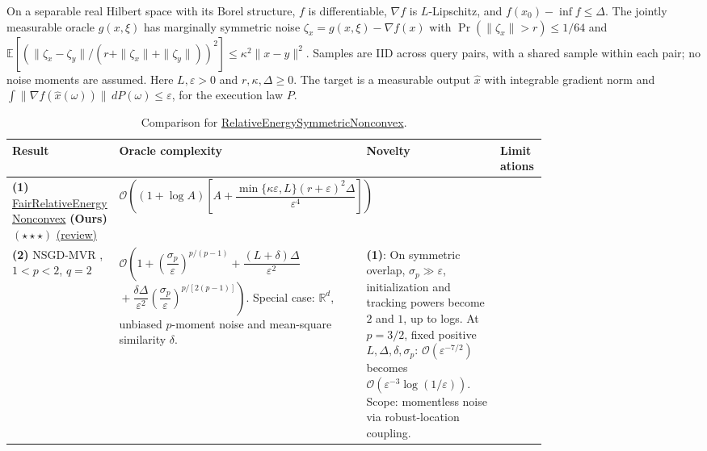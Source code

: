 \begin{table}[tp]
\centering
\caption{Comparison for \href{https://github.com/k3nfalt/longtails/blob/main/LongTails/Setups/RelativeEnergySymmetricNonconvex.lean}{RelativeEnergySymmetricNonconvex}.}\label{tab:RelativeEnergySymmetricNonconvex}
\parbox{\linewidth}{\footnotesize On a separable real Hilbert space with its Borel structure, $f$ is differentiable, $\nabla f$ is $L$-Lipschitz, and $f(x_0)-\inf f\le\Delta$. The jointly measurable oracle $g(x,\xi)$ has marginally symmetric noise $\zeta_x=g(x,\xi)-\nabla f(x)$ with $\Pr(\|\zeta_x\|>r)\le1/64$ and $\mathbb E[(\|\zeta_x-\zeta_y\|/(r+\|\zeta_x\|+\|\zeta_y\|))^2]\le\kappa^2\|x-y\|^2$. Samples are IID across query pairs, with a shared sample within each pair; no noise moments are assumed. Here $L,\varepsilon>0$ and $r,\kappa,\Delta\ge0$. The target is a measurable output $\widehat x$ with integrable gradient norm and $\int\|\nabla f(\widehat x(\omega))\|\,dP(\omega)\le\varepsilon$, for the execution law $P$.}\par\smallskip
\begin{threeparttable}
\footnotesize
\setlength{\tabcolsep}{4pt}\renewcommand{\arraystretch}{1.25}
\begin{tabularx}{\linewidth}{@{}>{\raggedright\arraybackslash}p{0.20\linewidth}>{\raggedright\arraybackslash}p{0.32\linewidth}>{\raggedright\arraybackslash}p{0.25\linewidth}>{\raggedright\arraybackslash}X@{}}
\toprule
\textbf{Result} & \textbf{Oracle complexity} & \textbf{Novelty} & \textbf{Limitations} \\
\midrule
\textbf{(1)} \href{https://github.com/k3nfalt/longtails/blob/main/LongTails/Theorems/FairRelativeEnergyNonconvex.lean}{Fair\allowbreak Relative\allowbreak Energy\allowbreak Nonconvex} \textbf{(Ours)} $(\star\star\star)$ \href{https://github.com/k3nfalt/longtails/blob/main/scripts/reviews/FairRelativeEnergyNonconvex.md}{(review)}
& $\mathcal O\!\left((1+\log A)\left[A+\dfrac{\min\{\kappa\varepsilon,L\}(r+\varepsilon)^2\Delta}{\varepsilon^4}\right]\right)$
& & \\
\midrule[1.2pt]
\textbf{(2)} NSGD-MVR \citep[Thm.~4.2, v2]{mshFradin2026v2}, $1<p<2$, $q=2$
& $\mathcal O\!\left(1+\left(\dfrac{\sigma_p}{\varepsilon}\right)^{\!p/(p-1)}+\dfrac{(L+\delta)\Delta}{\varepsilon^2}\right.$\newline
$\left.{}+\dfrac{\delta\Delta}{\varepsilon^2}\left(\dfrac{\sigma_p}{\varepsilon}\right)^{\!p/[2(p-1)]}\right)$.
Special case: $\mathbb R^d$, unbiased $p$-moment noise and mean-square similarity $\delta$.
& \textbf{(1)}: On symmetric overlap, $\sigma_p\gg\varepsilon$, initialization and tracking powers become $2$ and $1$, up to logs. At $p=3/2$, fixed positive $L,\Delta,\delta,\sigma_p$: $\mathcal O(\varepsilon^{-7/2})$ becomes $\mathcal O(\varepsilon^{-3}\log(1/\varepsilon))$. Scope: momentless noise via robust-location coupling.

\end{tabularx}
\end{threeparttable}
\end{table}
